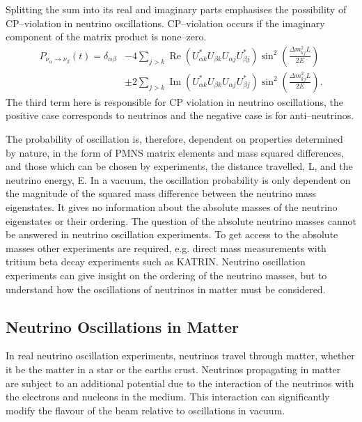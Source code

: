 Splitting the sum into its real and imaginary parts emphasises the possibility
of CP--violation in neutrino oscillations. CP--violation occurs if the imaginary
component of the matrix product is none--zero. 
\begin{align}
	\label{eqn:p_osc_im_re}
	P_{\nu_\alpha \rightarrow \nu_\beta}(t) = \delta_{\alpha \beta} 
	&- 4 \sum_{j > k} \operatorname{Re}(U^*_{\alpha k} U_{\beta k} U_{\alpha j} U^*_{\beta j}) \sin^2(\frac{\Delta m^2_{kj} L}{2E}) \nonumber \\
	&\pm 2 \sum_{j > k} \operatorname{Im}(U^*_{\alpha k} U_{\beta k} U_{\alpha j} U^*_{\beta j}) \sin^2(\frac{\Delta m^2_{kj} L}{2E}).
\end{align}
The third term here is responsible for CP violation in neutrino oscillations,
the positive case corresponds to neutrinos and the negative case is for
anti--neutrinos.

The probability of oscillation is, therefore, dependent on properties determined
by nature, in the form of PMNS matrix elements and mass squared differences, and
those which can be chosen by experiments, the distance travelled, L, and the
neutrino energy, E. In a vacuum, the oscillation probability is only dependent 
on the magnitude of the squared mass difference between the neutrino mass
eigenstates. It gives no information about the absolute masses of the 
neutrino eigenstates or their ordering. The question of the absolute
neutrino masses cannot be answered in neutrino oscillation experiments. To get
access to the absolute masses other experiments are required, e.g. direct mass
measurements with tritium beta decay experiments such as 
KATRIN\cite{Aker:2019qfn}.  Neutrino oscillation experiments can give insight 
on the ordering of the neutrino masses, but to understand how the oscillations 
of neutrinos in matter must be considered.

\subsection{Neutrino Oscillations in Matter}
In real neutrino oscillation experiments, neutrinos travel through matter,
whether it be the matter in a star or the earths crust. Neutrinos propagating in
matter are subject to an additional potential due to the interaction of the 
neutrinos with the electrons and nucleons in the medium.  This interaction can 
significantly modify the flavour of the beam relative to oscillations in 
vacuum.

